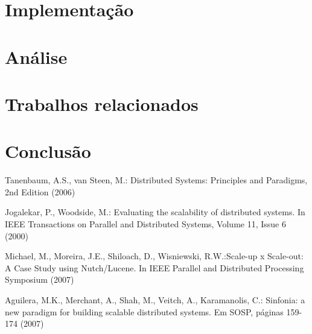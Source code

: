 \documentclass[a4paper,12pt]{report}
\begin{document}
\chapter{Implementação}
\chapter{Análise}
\chapter{Trabalhos relacionados}
\chapter{Conclusão}

\begin{thebibliography}{99}

 Tanenbaum, A.S., van Steen, M.: Distributed Systems: Principles and Paradigms, 2nd Edition (2006)

 Jogalekar, P., Woodside, M.: Evaluating the scalability of distributed systems. In IEEE Transactions on Parallel and Distributed Systems, Volume 11, Issue 6 (2000)

 Michael, M., Moreira, J.E., Shiloach, D., Wisniewski, R.W.:Scale-up x Scale-out: A Case Study using Nutch/Lucene. In IEEE Parallel and Distributed Processing Symposium (2007)

 Aguilera, M.K., Merchant, A., Shah, M., Veitch, A., Karamanolis, C.: Sinfonia: a new paradigm for building scalable distributed systems. Em SOSP, páginas 159-174 (2007)

\end{thebibliography}
\end{document}
